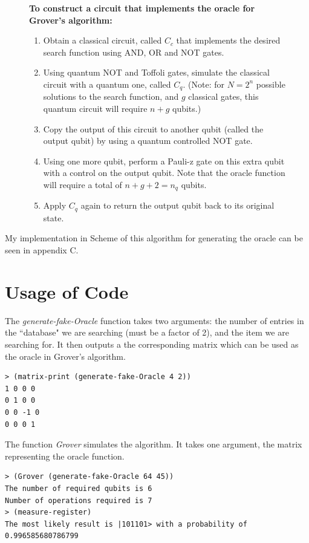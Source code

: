 \documentclass[11pt]{report}
\newcommand{\?}{\stackrel{?}{=}}
\begin{document}
\begin{figure}[H]
\begin{framed}
\textbf{To construct a circuit that implements the oracle for Grover's algorithm:}
\begin{enumerate}
\item Obtain a classical circuit, called $C_{c}$ that implements the desired search function using AND, OR and NOT gates.
\item Using quantum NOT and Toffoli gates, simulate the classical circuit with a quantum one, called $C_{q}$. (Note: for $N=2^n$ possible solutions to the search function, and $g$ classical gates, this quantum circuit will require $n+g$ qubits.)
\item Copy the output of this circuit to another qubit (called the output qubit) by using a quantum controlled NOT gate.
\item Using one more qubit, perform a Pauli-z gate on this extra qubit with a control on the output qubit. Note that the oracle function will require a total of $n+g+2=n_{q}$ qubits.
\item Apply $C_{q}$ again to return the output qubit back to its original state.
\end{enumerate}
\end{framed}
\end{figure}

My implementation in Scheme of this algorithm for generating the oracle can be seen in appendix C.

\section{Usage of Code}

The \textit{generate-fake-Oracle} function takes two arguments: the number of entries in the ``database" we are searching (must be a factor of 2), and the item we are searching for. It then outputs a the corresponding matrix which can be used as the oracle in Grover's algorithm.

\begin{verbatim}
> (matrix-print (generate-fake-Oracle 4 2))
1 0 0 0 
0 1 0 0 
0 0 -1 0 
0 0 0 1 
\end{verbatim}

The function \textit{Grover} simulates the algorithm. It takes one argument, the matrix representing the oracle function.

\begin{verbatim}
> (Grover (generate-fake-Oracle 64 45))
The number of required qubits is 6
Number of operations required is 7
> (measure-register)
The most likely result is |101101> with a probability of 0.996585680786799
\end{verbatim}
\end{document}
